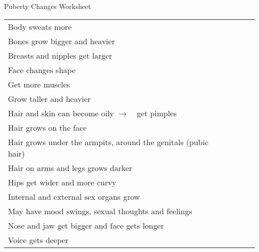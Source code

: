 \documentclass[12pt]{article}
\newcommand{\rarrow}{$\rightarrow$\ }
\begin{document}
	{\Large Puberty Changes Worksheet}

	\begin{center}
	\begin{tabular}{M{2.5in} | C{0.75in} | C{0.75in} | C{0.75in}}
		 &  &  & \\\hline
		Body sweats more&&&\\
		Bones grow bigger and heavier&&&\\
		Breasts and nipples get larger&&&\\
		Face changes shape&&&\\
		Get more muscles&&&\\
		Grow taller and heavier&&&\\
		Hair and skin can become oily \rarrow\ get pimples&&&\\
		Hair grows on the face&&&\\
		Hair grows under the armpits, around the genitals (pubic hair)&&&\\
		Hair on arms and legs grows darker&&&\\
		Hips get wider and more curvy&&&\\
		Internal and external sex organs grow&&&\\
		May have mood swings, sexual thoughts and feelings&&&\\
		Nose and jaw get bigger and face gets longer&&&\\
		Voice gets deeper&&&\\
	\end{tabular}
	\end{center}
\end{document}
